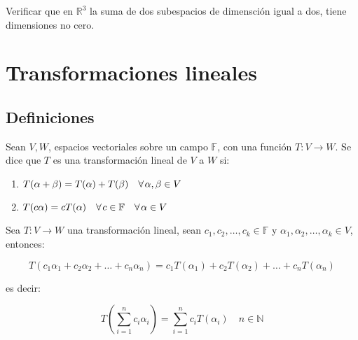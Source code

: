 		\begin{ejercicio}
			Verificar que en $\mathbb{R}^3$ la suma de dos subespacios de dimensción igual a dos, tiene dimensiones no cero.
		\end{ejercicio}


\section{Transformaciones lineales}

	\subsection{Definiciones}

		\begin{definicion}
			Sean $V, W$, espacios vectoriales sobre un campo $\mathbb{F}$, con una función $T \colon V \to W$.
			Se dice que $T$ es una transformación lineal de $V$ a $W$ si:

			\begin{enumerate}
				\item $T(\alpha + \beta) = T(\alpha) + T(\beta) \quad \forall \mkern2mu \alpha, \beta \in V$
				\item $T(c \alpha) = c T(\alpha) \quad \forall \mkern2mu c \in \mathbb{F} \quad \forall \mkern2mu \alpha \in V$
			\end{enumerate}
		\end{definicion}

		\begin{proposicion}
			Sea $T \colon V \to W$ una transformación lineal, sean $c_1, c_2, \dots, c_k \in \mathbb{F}$ y $\alpha_1, \alpha_2, \dots, \alpha_k \in V$, entonces:

			\begin{equation*}
				T(c_1 \alpha_1 + c_2 \alpha_2 + \dots + c_n \alpha_n) = c_1 T(\alpha_1) + c_2 T(\alpha_2) + \dots + c_n T(\alpha_n)
			\end{equation*}

			es decir:

			\begin{equation}
				T \left( \sum_{i=1}^n c_i \alpha_i \right) = \sum_{i=1}^n c_i T(\alpha_i) \quad n \in \mathbb{N}
			\end{equation}
		\end{proposicion}

